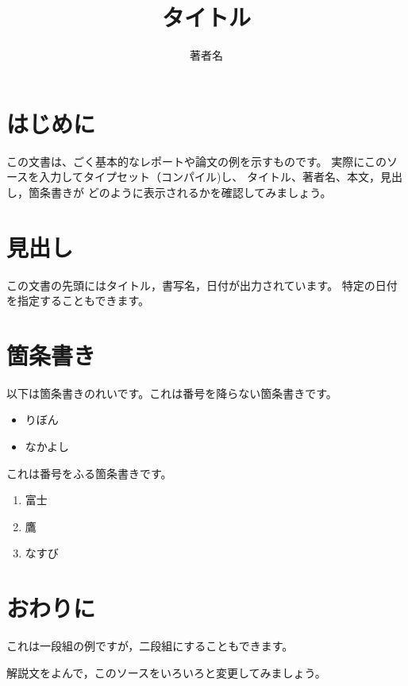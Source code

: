 \documentclass{jsarticle}
\begin{document}
\title{タイトル}
\author{著者名}
\maketitle

\section{はじめに}

この文書は、ごく基本的なレポートや論文の例を示すものです。
実際にこのソースを入力してタイプセット（コンパイル)し、
タイトル、著者名、本文，見出し，箇条書きが
どのように表示されるかを確認してみましょう。

\section{見出し}

この文書の先頭にはタイトル，書写名，日付が出力されています。
特定の日付を指定することもできます。

\section{箇条書き}

以下は箇条書きのれいです。これは番号を降らない箇条書きです。

\begin{itemize}
  \item りぼん
  \item なかよし
\end{itemize}

これは番号をふる箇条書きです。

\begin{enumerate}
  \item 富士
  \item 鷹
  \item なすび
\end{enumerate}

\section{おわりに}

これは一段組の例ですが，二段組にすることもできます。

解説文をよんで，このソースをいろいろと変更してみましょう。
\end{document}
